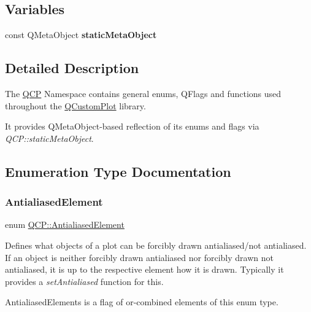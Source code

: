 \subsection*{Variables}
\begin{DoxyCompactItemize}
\item 
const Q\+Meta\+Object {\bfseries static\+Meta\+Object}
\end{DoxyCompactItemize}


\subsection{Detailed Description}
The \hyperlink{namespace_q_c_p}{Q\+CP} Namespace contains general enums, Q\+Flags and functions used throughout the \hyperlink{class_q_custom_plot}{Q\+Custom\+Plot} library.

It provides Q\+Meta\+Object-\/based reflection of its enums and flags via {\itshape Q\+C\+P\+::static\+Meta\+Object}. 

\subsection{Enumeration Type Documentation}
\mbox{\label{namespace_q_c_p_ae55dbe315d41fe80f29ba88100843a0c}} 
\subsubsection{\texorpdfstring{Antialiased\+Element}{AntialiasedElement}\hspace{0.1cm}{\footnotesize\ttfamily [1/2]}}
{\footnotesize\ttfamily enum \hyperlink{namespace_q_c_p_ae55dbe315d41fe80f29ba88100843a0c}{Q\+C\+P\+::\+Antialiased\+Element}}

Defines what objects of a plot can be forcibly drawn antialiased/not antialiased. If an object is neither forcibly drawn antialiased nor forcibly drawn not antialiased, it is up to the respective element how it is drawn. Typically it provides a {\itshape set\+Antialiased} function for this.

{\ttfamily Antialiased\+Elements} is a flag of or-\/combined elements of this enum type.

